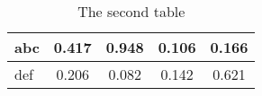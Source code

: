 \begin{longtable}{l|SSSS}
\caption{The second table}\label{}\\
\toprule

abc	&0.417	&0.948	&0.106	&0.166	\\\hline
def	&0.206	&0.082	&0.142	&0.621	\\
\bottomrule
\end{longtable}